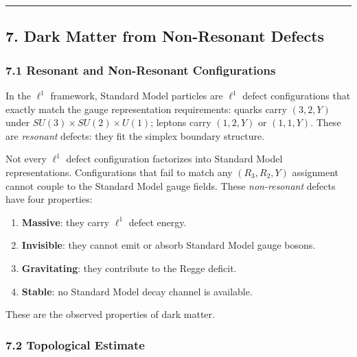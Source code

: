 \documentclass[
]{article}
\providecommand{\tightlist}{%
  \setlength{\itemsep}{0pt}\setlength{\parskip}{0pt}}
\begin{document}
\begin{center}\rule{0.5\linewidth}{0.5pt}\end{center}

\hypertarget{dark-matter-from-non-resonant-defects}{%
\subsection{7. Dark Matter from Non-Resonant
Defects}\label{dark-matter-from-non-resonant-defects}}

\hypertarget{resonant-and-non-resonant-configurations}{%
\subsubsection{7.1 Resonant and Non-Resonant
Configurations}\label{resonant-and-non-resonant-configurations}}

In the \(\ell^1\) framework, Standard Model particles are \(\ell^1\)
defect configurations that exactly match the gauge representation
requirements: quarks carry \((3, 2, Y)\) under
\(SU(3) \times SU(2) \times U(1)\); leptons carry \((1, 2, Y)\) or
\((1, 1, Y)\). These are \emph{resonant} defects: they fit the simplex
boundary structure.

Not every \(\ell^1\) defect configuration factorizes into Standard Model
representations. Configurations that fail to match any \((R_3, R_2, Y)\)
assignment cannot couple to the Standard Model gauge fields. These
\emph{non-resonant} defects have four properties:

\begin{enumerate}
\def\labelenumi{\arabic{enumi}.}
\tightlist
\item
  \textbf{Massive}: they carry \(\ell^1\) defect energy.
\item
  \textbf{Invisible}: they cannot emit or absorb Standard Model gauge
  bosons.
\item
  \textbf{Gravitating}: they contribute to the Regge deficit.
\item
  \textbf{Stable}: no Standard Model decay channel is available.
\end{enumerate}

These are the observed properties of dark matter.

\hypertarget{topological-estimate}{%
\subsubsection{7.2 Topological Estimate}\label{topological-estimate}}
\end{document}
